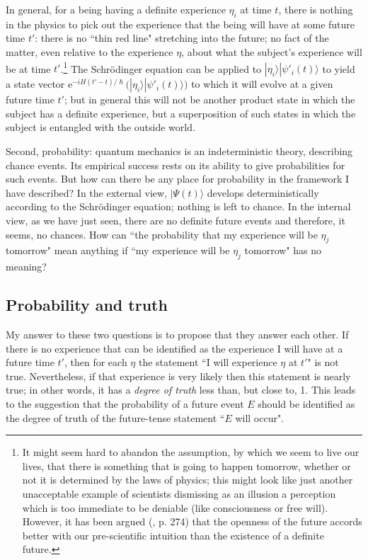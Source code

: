 \documentclass[12pt,reqno]{article}
\renewcommand{\(}{\left(}
\renewcommand{\)}{\right)}
\newcommand{\e}{\mbox{e}}
\renewcommand{\hbar}{\hslash}
\newcommand{\<}{\langle}
\renewcommand{\>}{\rangle}
\theoremstyle{plain} %
\begin{document}
 In general, for a being having a definite experience $\eta_i$ at time $t$, there is nothing in the physics to pick out the experience that the being will have at some future time $t'$: there is no ``thin red line" stretching into the future; no fact of the matter, even relative to the experience $\eta$, about what the subject's experience will be at time $t'$.\footnote{It might seem hard to abandon the assumption, by which we seem to live our lives, that there is something that is going to happen tomorrow, whether or not it is determined by the laws of physics; this might look like just another unacceptable example of scientists dismissing as an illusion a perception which is too immediate to be deniable (like consciousness or free will). However, it has been argued (\cite{openfuture}, \cite{Wallace:multiverse} p. 274) that the openness of the future accords better with our pre-scientific intuition than the existence of a definite future.} The Schr\"odinger equation can be applied to $|\eta_i\>|\psi'_i(t)\>$ to yield a state vector $\e^{-iH(t'-t)/\hbar}\big(|\eta_i\>|\psi'_i(t)\>\big)$ to which it will evolve at a given future time $t'$; but in general this will not be another product state in which the subject has a definite experience, but a superposition of such states in which the subject is entangled with the outside world. 

Second, probability: quantum mechanics is an indeterministic theory, describing chance events. Its empirical success rests on its ability to give probabilities for such events. But how can there be any place for probability in the framework I have described? In the external view, $|\Psi(t)\>$ develops deterministically according to the Schr\"odinger equation; nothing is left to chance. In the internal view, as we have just seen, there are no definite future events and therefore, it seems, no chances. How can ``the probability that my experience will be $\eta_j$ tomorrow" mean anything if ``my experience will be $\eta_j$ tomorrow" has no meaning?

\subsection{Probability and truth}
\label{subsec:probtruth}
 
 My answer to these two questions is to propose that they answer each other. If there is no experience that can be identified as the experience I will have at a future time $t'$, then for each $\eta$ the statement ``I will experience $\eta$ at $t'$" is not true. Nevertheless, if that experience is very likely then this statement is nearly true; in other words, it has a \emph{degree of truth} less than, but close to, 1. This leads to the suggestion that the probability of a future event $E$ should be identified as the degree of truth of the future-tense statement ``$E$ will occur". 
 
\end{document}
